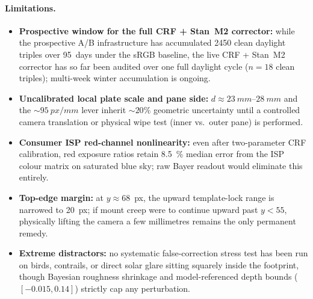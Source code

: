 \documentclass[11pt,a4paper]{article}
\begin{document}
\paragraph{Limitations.}
\begin{itemize}
\item \textbf{Prospective window for the full CRF + Stan~M2 corrector:} while the
  prospective A/B infrastructure has accumulated \num{2450} clean daylight triples over
  95~days under the sRGB baseline, the live CRF + Stan~M2 corrector has so far been
  audited over one full daylight cycle ($n=18$ clean triples); multi-week winter
  accumulation is ongoing.
\item \textbf{Uncalibrated local plate scale and pane side:} $d \approx \SIrange{23}{28}{mm}$
  and the $\sim\SI{95}{px/mm}$ lever inherit $\sim 20\%$ geometric uncertainty until a
  controlled camera translation or physical wipe test (inner vs.\ outer pane) is
  performed.
\item \textbf{Consumer ISP red-channel nonlinearity:} even after two-parameter CRF
  calibration, red exposure ratios retain \SI{8.5}{\percent} median error from the ISP
  colour matrix on saturated blue sky; raw Bayer readout would eliminate this entirely.
\item \textbf{Top-edge margin:} at $y \approx 68$~px, the upward template-lock range is
  narrowed to \SI{20}{px}; if mount creep were to continue upward past $y < 55$,
  physically lifting the camera a few millimetres remains the only permanent remedy.
\item \textbf{Extreme distractors:} no systematic false-correction stress test has been
  run on birds, contrails, or direct solar glare sitting squarely inside the footprint,
  though Bayesian roughness shrinkage and model-referenced depth bounds
  ($[-0.015, 0.14]$) strictly cap any perturbation.
\end{itemize}



\end{document}
